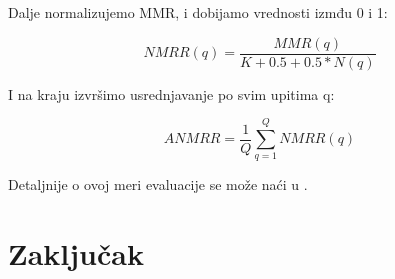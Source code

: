 \documentclass{article}
\begin{document}
Dalje normalizujemo MMR, i dobijamo vrednosti izmđu 0 i 1:

$$ NMRR(q) = \frac{MMR(q)}{K + 0.5 + 0.5*N(q)}$$

I na kraju izvršimo usrednjavanje po svim upitima q:

$$ ANMRR = \frac{1}{Q} \sum_{q=1}^{Q} {NMRR(q)}$$

Detaljnije o ovoj meri evaluacije se može naći u \cite{long2003fundamentals}.

\section{Zaključak}



\newpage


\end{document}
